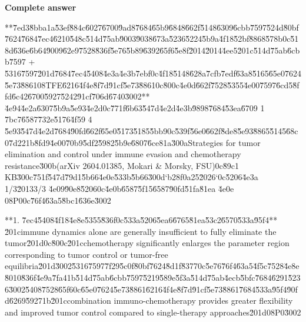\documentclass[10pt]{article}
\begin{document}
\textbf{Complete answer}
\begin{AnswerText}
**\u7ed3\u8bba\uff1a\u53ef\u884c\u6027\u6700\u9ad8\u7684\u65b9\u6848\u662f\u5148\u6309\u6cbb\u7597\u524d\u80bf\u7624\u7684\u7ec4\u6210\u548c\u514d\u75ab\u9003\u9038\u673a\u5236\u5224\u5b9a\u4f18\u52bf\u8868\u578b\uff0c\u518d\u636e\u6b64\u9009\u62e9\u7528\u836f\u5e76\u5b89\u6392\u65f6\u5e8f\u2014\u2014\u4ee5\u201c\u514d\u75ab\u6cbb\u7597 + \u5316\u7597\u201d\u7684\u7ec4\u5408\u4e3a\u4e3b\u7ebf\uff0c\u4f18\u5148\u628a\u7cfb\u7edf\u63a8\u5165\u65e0\u7624\u5e73\u8861\uff08TFE\u6216\u4f4e\u8f7d\u91cf\u5e73\u8861\uff0c\u800c\u4e0d\u662f\u7528\u5355\u4e00\u7597\u6cd5\u8ffd\u6c42\u6700\u5927\u5242\u91cf\u706d\u6740\u3002** \u4e94\u4e2a\u6307\u5b9a\u5e93\u4e2d\uff0c\u771f\u6b63\u547d\u4e2d\u4e3b\u9898\u7684\u53ea\u6709 1 \u7bc7\u6587\u732e\u5176\u4f59 4 \u5e93\u547d\u4e2d\u7684\u90fd\u662f\u65e0\u5173\u5185\u5bb9\uff0c\u539f\u56e0\u662f\u8de8\u5e93\u8865\u5145\u68c0\u7d22\uff1b\u8fd9\u4e00\u70b9\u5df2\u5982\u5b9e\u6807\u6ce8\uff1a\u300aStrategies for tumor elimination and control under immune evasion and chemotherapy resistance\u300b(arXiv 2604.01385, Mokari & Morsky, FSU)\uff0c\u89c1 KB\u300c\u751f\u547d\u79d1\u5b66\u4e0e\u533b\u5b66\u300d`b28f0a25\u2026`\uff0c\u5206\u4e3a 1/3\u20133/3 \u4e09\u90e8\u5206\uff0c\u4e0b\u6587\u5f15\u6587\u90fd\u51fa\u81ea  \u4e0e \uff08P0\uff0c\u76f4\u63a5\u8bc1\u636e\u3002

**1. \u7ec4\u5408\u4f18\u4e8e\u5355\u836f\uff0c\u533a\u5206\u5ea6\u6765\u81ea\u53c2\u6570\u533a\u95f4**
\u201cimmune dynamics alone are generally insufficient to fully eliminate the tumor\u201d\uff0c\u800c\u201cchemotherapy significantly enlarges the parameter region corresponding to tumor control or tumor-free equilibria\u201d\u3002\u5316\u7597\u7f29\u5c0f\u80bf\u7624\u8d1f\u8377\uff0c\u5e76\u76f4\u63a5\u4f5c\u7528\u4e8e\u8010\u836f\u4e9a\u7fa4\uff1b\u514d\u75ab\u6cbb\u7597\u5219\u589e\u5f3a\u514d\u75ab\u4ecb\u5bfc\u7684\u6291\u5236\u3002\u5408\u7528\u65f6\uff0c\u65e0\u7624\u5e73\u8861\u6216\u4f4e\u8f7d\u91cf\u5e73\u8861\u7684\u533a\u95f4\u90fd\u6269\u5927\uff1b\u201ccombination immuno-chemotherapy provides greater flexibility and improved tumor control compared to single-therapy approaches\u201d\uff08P0\u3002


\end{AnswerText}
\end{document}
